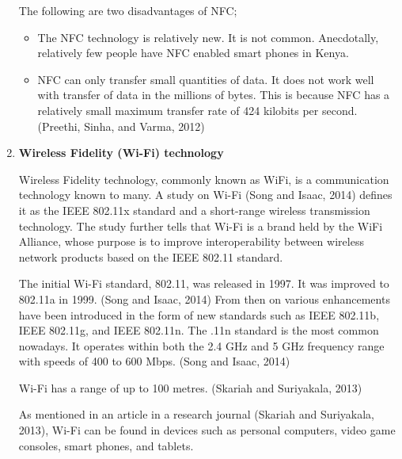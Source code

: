 \documentclass[12pt,svgnames,smaller]{article} %
\begin{document}
\begin{enumerate}
	The following are two disadvantages of NFC;
	
	\begin{itemize}
		\item The NFC technology is relatively new. It is not common. Anecdotally, relatively few people have NFC enabled smart phones in Kenya.
		\item NFC can only transfer small quantities of data. It does not work well with transfer of data in the millions of bytes. This is because NFC has a relatively small maximum transfer rate of 424 kilobits per second. (Preethi, Sinha, and Varma, 2012)

	\end{itemize}
	
	
	\item \textbf{ Wireless Fidelity (Wi-Fi) technology } 
	
	Wireless Fidelity technology, commonly known as WiFi, is a communication technology known to many. A study on Wi-Fi (Song and Isaac, 2014) defines it as the IEEE 802.11x standard and a short-range wireless transmission technology. The study further tells that Wi-Fi is a brand held by the WiFi Alliance, whose purpose is to improve interoperability between wireless network products based on the IEEE 802.11 standard. 
	
	The initial Wi-Fi standard, 802.11, was released in 1997. It was improved to 802.11a in 1999. (Song and Isaac, 2014) From then on various enhancements have been introduced in the form of new standards such as IEEE 802.11b, IEEE 802.11g, and IEEE 802.11n. The .11n standard is the most common nowadays. It operates within both the 2.4 GHz and 5 GHz frequency range with speeds of 400 to 600 Mbps. (Song and Isaac, 2014) 
	
	Wi-Fi has a range of up to 100 metres. (Skariah and Suriyakala, 2013)
	
	As mentioned in an article in a research journal (Skariah and Suriyakala, 2013), Wi-Fi can be found in devices such as personal computers, video game consoles, smart phones, and tablets.
	

\end{enumerate}
\end{document}
